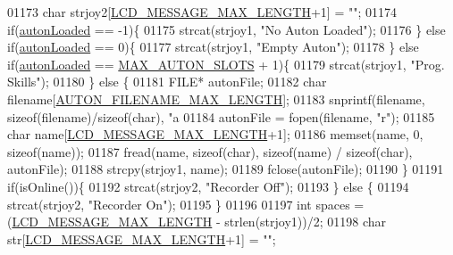 \begin{DoxyCode}
{{{{{{{{{{{{{{{01173         \textcolor{keywordtype}{char} strjoy2[\hyperlink{lcdmsg_8h_abe4c4b70fc6f44ae3680e5b2c68cdd00}{LCD\_MESSAGE\_MAX\_LENGTH}+1] = \textcolor{stringliteral}{""};
01174         \textcolor{keywordflow}{if}(\hyperlink{autonrecorder_8c_a4e72d907ee74449b71b5e20943f4217e}{autonLoaded} == -1)\{
01175             strcat(strjoy1, \textcolor{stringliteral}{"No Auton Loaded"});
01176         \} \textcolor{keywordflow}{else} \textcolor{keywordflow}{if}(\hyperlink{autonrecorder_8c_a4e72d907ee74449b71b5e20943f4217e}{autonLoaded} == 0)\{
01177             strcat(strjoy1, \textcolor{stringliteral}{"Empty Auton"});
01178         \} \textcolor{keywordflow}{else} \textcolor{keywordflow}{if}(\hyperlink{autonrecorder_8c_a4e72d907ee74449b71b5e20943f4217e}{autonLoaded} == \hyperlink{autonrecorder_8h_a5173a11a545cb4020fdd139552dc15c1}{MAX\_AUTON\_SLOTS} + 1)\{
01179             strcat(strjoy1, \textcolor{stringliteral}{"Prog. Skills"});
01180         \} \textcolor{keywordflow}{else} \{
01181             FILE* autonFile;
01182             \textcolor{keywordtype}{char} filename[\hyperlink{autonrecorder_8h_a9411d1482daa18dd8221c30db7fc6e4e}{AUTON\_FILENAME\_MAX\_LENGTH}];
01183             snprintf(filename, \textcolor{keyword}{sizeof}(filename)/\textcolor{keyword}{sizeof}(\textcolor{keywordtype}{char}), \textcolor{stringliteral}{"a%
01184             autonFile = fopen(filename, \textcolor{stringliteral}{"r"});
01185             \textcolor{keywordtype}{char} name[\hyperlink{lcdmsg_8h_abe4c4b70fc6f44ae3680e5b2c68cdd00}{LCD\_MESSAGE\_MAX\_LENGTH}+1];
01186             memset(name, 0, \textcolor{keyword}{sizeof}(name));
01187             fread(name, \textcolor{keyword}{sizeof}(\textcolor{keywordtype}{char}), \textcolor{keyword}{sizeof}(name) / \textcolor{keyword}{sizeof}(\textcolor{keywordtype}{char}), autonFile);
01188             strcpy(strjoy1, name);
01189             fclose(autonFile);
01190         \}
01191         \textcolor{keywordflow}{if}(isOnline())\{
01192             strcat(strjoy2, \textcolor{stringliteral}{"Recorder Off"});
01193         \} \textcolor{keywordflow}{else} \{
01194             strcat(strjoy2, \textcolor{stringliteral}{"Recorder On"});
01195         \}
01196 
01197         \textcolor{keywordtype}{int} spaces = (\hyperlink{lcdmsg_8h_abe4c4b70fc6f44ae3680e5b2c68cdd00}{LCD\_MESSAGE\_MAX\_LENGTH} - strlen(strjoy1))/2;
01198         \textcolor{keywordtype}{char} str[\hyperlink{lcdmsg_8h_abe4c4b70fc6f44ae3680e5b2c68cdd00}{LCD\_MESSAGE\_MAX\_LENGTH}+1] = \textcolor{stringliteral}{""};
}}}}}}}}}}}}}}}}
\end{DoxyCode}
